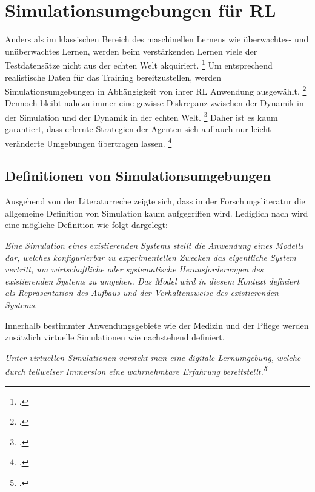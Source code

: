 \section{Simulationsumgebungen für RL}

Anders als im klassischen Bereich des maschinellen Lernens wie überwachtes- und unüberwachtes Lernen, werden beim verstärkenden Lernen viele der Testdatensätze nicht aus der echten Welt akquiriert. \footcite[Vgl.][S. 1]{Zhang.2018}
Um entsprechend realistische Daten für das Training bereitzustellen, werden Simulationsumgebungen in Abhängigkeit von ihrer RL Anwendung ausgewählt. \footcite[Vgl.][S. 7]{Korber.2021}
Dennoch bleibt nahezu immer eine gewisse Diskrepanz zwischen der Dynamik in der Simulation und der Dynamik in der echten Welt. \footcite[Vgl.][S. 1]{Bharadhwaj.2019}
Daher ist es kaum garantiert, dass erlernte Strategien der Agenten sich auf auch nur leicht veränderte Umgebungen übertragen lassen. \footcite[Vgl.][S. 1]{Bharadhwaj.2019}

\subsection{Definitionen von Simulationsumgebungen}
Ausgehend von der Literaturreche zeigte sich, dass in der Forschungsliteratur die allgemeine Definition von Simulation kaum aufgegriffen wird.
Lediglich nach \cite[]{Maria.1997} wird eine mögliche Definition wie folgt dargelegt:

\textit{Eine Simulation eines existierenden Systems stellt die Anwendung eines Modells dar, welches konfigurierbar zu experimentellen Zwecken das eigentliche System vertritt, um wirtschaftliche oder systematische Herausforderungen des existierenden Systems zu umgehen.
Das Model wird in diesem Kontext definiert als Repräsentation des Aufbaus und der Verhaltensweise des existierenden Systems.}

Innerhalb bestimmter Anwendungsgebiete wie der Medizin und der Pflege werden zusätzlich virtuelle Simulationen wie nachstehend definiert.

\textit{Unter virtuellen Simulationen versteht man eine digitale Lernumgebung, welche durch teilweiser Immersion eine wahrnehmbare Erfahrung bereitstellt.\footcite[Vgl.][S. 1]{Foronda.2021}}

